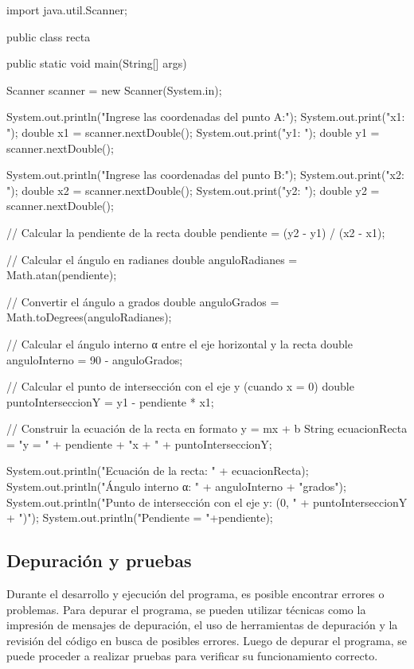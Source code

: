 \begin{javaCode}
import java.util.Scanner;

public class recta {
    public static void main(String[] args) {
        Scanner scanner = new Scanner(System.in);

        System.out.println("Ingrese las coordenadas del punto A:");
        System.out.print("x1: ");
        double x1 = scanner.nextDouble();
        System.out.print("y1: ");
        double y1 = scanner.nextDouble();

        System.out.println("Ingrese las coordenadas del punto B:");
        System.out.print("x2: ");
        double x2 = scanner.nextDouble();
        System.out.print("y2: ");
        double y2 = scanner.nextDouble();

        // Calcular la pendiente de la recta
        double pendiente = (y2 - y1) / (x2 - x1);

        // Calcular el ángulo en radianes
        double anguloRadianes = Math.atan(pendiente);

        // Convertir el ángulo a grados
        double anguloGrados = Math.toDegrees(anguloRadianes);

        // Calcular el ángulo interno α entre el eje horizontal y la recta
        double anguloInterno = 90 - anguloGrados;

        // Calcular el punto de intersección con el eje y (cuando x = 0)
        double puntoInterseccionY = y1 - pendiente * x1;

        // Construir la ecuación de la recta en formato y = mx + b
        String ecuacionRecta = "y = " + pendiente + "x + " + puntoInterseccionY;

        System.out.println("Ecuación de la recta: " + ecuacionRecta);
        System.out.println("Ángulo interno α: " + anguloInterno + "grados");
        System.out.println("Punto de intersección con el eje y: (0, " + puntoInterseccionY + ")");
        System.out.println("Pendiente = "+pendiente);
       
    }
}
\end{javaCode}

\subsection{Depuración y pruebas}

Durante el desarrollo y ejecución del programa, es posible encontrar errores o problemas. Para depurar el programa, se pueden utilizar técnicas como la impresión de mensajes de depuración, el uso de herramientas de depuración y la revisión del código en busca de posibles errores. Luego de depurar el programa, se puede proceder a realizar pruebas para verificar su funcionamiento correcto.

